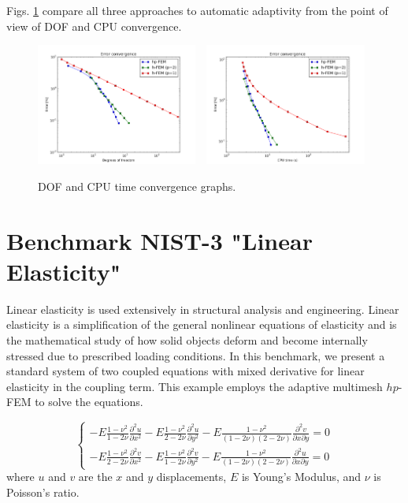 \documentclass[12pt]{elsarticle}
\begin{document}
Figs. \ref{fig:nist-2-conv} compare all
three approaches to automatic adaptivity from the point
of view of DOF and CPU convergence.

\begin{figure}[H]
\centering
\vspace{-3mm}
\includegraphics[height=4cm]{nist/nist-2/conv_dof_aniso.png}\ \
\includegraphics[height=4cm]{nist/nist-2/conv_cpu_aniso.png}
\caption{DOF and CPU time convergence graphs.}
\label{fig:nist-2-conv}
\end{figure}


\section{Benchmark NIST-3 "Linear Elasticity"}
\label{sec:bench-3}

Linear elasticity is used extensively in structural analysis
and engineering. Linear elasticity is a simplification
of the general nonlinear equations of elasticity and is the mathematical
study of how solid objects deform and become internally
stressed due to prescribed loading conditions.
In this benchmark, we present a standard system of two
coupled equations with mixed derivative for linear elasticity
in the coupling term. This example employs the adaptive multimesh $hp$-FEM
to solve the equations.

\begin{equation}\label{crack}
\left\{
\begin{array}{l}
\displaystyle
-E \frac{1-\nu^2}{1-2\nu} \frac{\partial^{2} u}{\partial x^{2}} - E\frac{1-\nu^2}{2-2 \nu} \frac{\partial^{2} u}{\partial y^{2}}
-E \frac{1-\nu^2}{(1-2\nu)(2-2\nu)} \frac{\partial^{2} v}{\partial x \partial y} = 0 \\
\displaystyle
-E \frac{1-\nu^2}{2-2\nu} \frac{\partial^{2} v}{\partial x^{2}} - E\frac{1-\nu^2}{1-2\nu} \frac{\partial^{2} v}{\partial y^{2}}
-E \frac{1-\nu^2}{(1-2\nu)(2-2\nu)} \frac{\partial^{2} u}{\partial x \partial y} = 0
\end{array}
\right.
\end{equation}
where $u$ and $v$ are the 
$x$ and $y$ displacements, $E$ is Young's Modulus,
and $\nu$ is Poisson's ratio.
\end{document}
